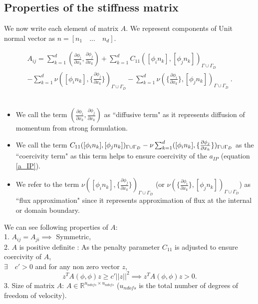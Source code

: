 \documentclass[a4paper,oneside,openright,spanish,english]{book}
\begin{document}
\subsection{Properties of the stiffness matrix} \label{property_stif_mat_stokes}

We now write each element of matrix $A$. We represent components of Unit normal vector as $n = [n_1 \quad ... \quad n_d]$.

\begin{equation} \label{matrix A}
\begin{split}
A_{ij} = \sum_{k=1}^d (\frac{\partial \phi_i}{\partial x_k} , \frac{\partial \phi_j}{\partial x_k}) + \sum_{k=1}^d C_{11} ([\phi_i n_k] , [\phi_j n_k])_{\Gamma \cup \Gamma_D} \\ - \sum_{k=1}^d \nu ([\phi_i n_k] , \lbrace \frac{\partial \phi_j}{\partial x_k} \rbrace)_{\Gamma \cup \Gamma_D} - \sum_{k=1}^d \nu (\lbrace \frac{\partial \phi_i}{\partial x_k} \rbrace , [\phi_j n_k])_{\Gamma \cup \Gamma_D} \ .
\end{split}
\end{equation}
${}$\\

\begin{itemize}

\item We call the term $(\frac{\partial \phi_i}{\partial x_k} , \frac{\partial \phi_j}{\partial x_k})$ as ``diffusive term" as it represents diffusion of momentum from strong formulation. 
\item We call the term $C_{11} ([\phi_i n_k] , [\phi_j n_k])_{\Gamma \cup \Gamma_D} \\ - \nu \sum_{k=1}^d ([\phi_i n_k] , \lbrace \frac{\partial \phi_j}{\partial x_k} \rbrace)_{\Gamma \cup \Gamma_D}$ as the ``coercivity term" as this term helps to ensure coercivity of the $a_{IP}$ (equation \eqref{a_IP}). 
\item We refer to the term $\nu ([\phi_i n_k] , \lbrace \frac{\partial \phi_j}{\partial x_k} \rbrace)_{\Gamma \cup \Gamma_D}$ (or $\nu (\lbrace \frac{\partial \phi_i}{\partial x_k} \rbrace , [\phi_j n_k])_{\Gamma \cup \Gamma_D}$) as ``flux approximation" since it represents approximation of flux at the internal or domain boundary.

\end{itemize}

We can see following properties of $A$: 
\\
1. $A_{ij} = A_{ji} \implies$ Symmetric,\\
2. $A$ is positive definite : As the penalty parameter $C_{11}$ is adjusted to ensure coercivity of $A$,\\
$\exists \quad c' > 0 $ and for any non zero vector $z$,
\begin{equation}
z^T A( \phi , \phi ) z \geq c' || z ||^2 \implies z^T A( \phi , \phi ) z > 0 \textrm{.}
\end{equation}
3. Size of matrix $A$: $A \in \mathbb{R}^{u_{ndofs} \times u_{ndofs}}$ ($u_{ndofs}$ is the total number of degrees of freedom of velocity).\\
\end{document}
